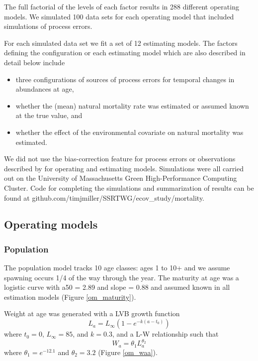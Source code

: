\documentclass[
  12pt,
]{article}
\begin{document}
The full factorial of the levels of each factor results in 288 different
operating models. We simulated 100 data sets for each operating model
that included simulations of process errors.

For each simulated data set we fit a set of 12 estimating models. The
factors defining the configuration or each estimating model which are
also described in detail below include

\begin{itemize}
\item three configurations of sources of process errors for temporal changes in abundances at age, 
\item whether the (mean) natural mortality rate was estimated or assumed known at the true value, and
\item whether the effect of the environmental covariate on natural mortality was estimated.
\end{itemize}

We did not use the bias-correction feature for process errors or
observations described by \citet{stockmiller21} for operating and
estimating models. Simulations were all carried out on the University of
Massachusetts Green High-Performance Computing Cluster. Code for
completing the simulations and summarization of results can be found at
github.com/timjmiller/SSRTWG/ecov\_study/mortality.

\hypertarget{operating-models}{%
\subsection*{Operating models}\label{operating-models}}

\hypertarget{population}{%
\subsubsection*{Population}\label{population}}

The population model tracks 10 age classes: ages 1 to 10+ and we assume
spawning occurs 1/4 of the way through the year. The maturity at age was
a logistic curve with a50 = 2.89 and slope = 0.88 and assumed known in
all estimation models (Figure \ref{om_maturity}).

Weight at age was generated with a LVB growth function \[
L_a = L_{\infty}\left(1 - e^{-k(a - t_0)}\right)
\] where \(t_0 = 0\), \(L_\infty = 85\), and \(k = 0.3\), and a L-W
relationship such that \[
W_a = \theta_1 L_a^{\theta_2}
\] where \(\theta_1 = e^{-12.1}\) and \(\theta_2 = 3.2\) (Figure
\ref{om_waa}).
\end{document}
